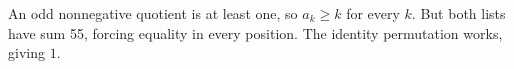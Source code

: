 An odd nonnegative quotient is at least one, so $a_k\ge k$ for every $k$. But both lists have sum 55, forcing equality in every position. The identity permutation works, giving $\boxed1$.
